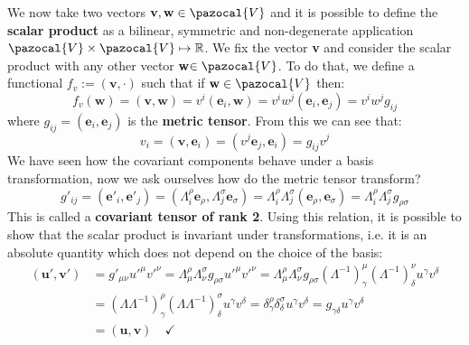\documentclass[../main.tex]{subfiles}
\begin{document}
We now take two vectors $\textbf{v},\textbf{w}\in\pazocal{V}$ and it is possible to define the \textbf{scalar product} as a bilinear, symmetric and non-degenerate application $\pazocal{V}\times\pazocal{V}\mapsto\mathbb{R}$. We fix the vector \textbf{v} and consider the scalar product with any other vector \textbf{w}$\in\pazocal{V}$. To do that, we define a functional $f_v:=(\textbf{v},\cdot)$ such that if $\textbf{w}\in\pazocal{V}$ then:
\[
f_v(\textbf{w})=(\textbf{v},\textbf{w})=v^i(\textbf{e}_i,\textbf{w})=v^iw^j(\textbf{e}_i,\textbf{e}_j)=v^iw^jg_{ij} 
\]
where $g_{ij}=(\textbf{e}_i,\textbf{e}_j)$ is the \textbf{metric tensor}. From this we can see that:
\[
v_i=(\textbf{v},\textbf{e}_i)=(v^j\textbf{e}_j,\textbf{e}_i)=g_{ij}v^j
\]
We have seen how the covariant components behave under a basis transformation, now we ask ourselves how do the metric tensor transform? 
\[
g'_{ij}=(\textbf{e}'_i,\textbf{e}'_j)=(\Lambda^\rho_i\textbf{e}_\rho,\Lambda^\sigma_j\textbf{e}_\sigma)=\Lambda^\rho_i\Lambda^\sigma_j(\textbf{e}_\rho,\textbf{e}_\sigma)=\Lambda^\rho_i\Lambda^\sigma_jg_{\rho\sigma}
\]
This is called a \textbf{covariant tensor of rank 2}. 
Using this relation, it is possible to show that the scalar product is invariant under transformations, i.e. it is an absolute quantity which does not depend on the choice of the basis:
\begin{align*}
(\textbf{u}',\textbf{v}')&=g'_{\mu\nu}u'^\mu v'^\nu=\Lambda^\rho_\mu\Lambda^\sigma_\nu g_{\rho\sigma}u'^\mu v'^\nu=\Lambda^\rho_\mu\Lambda^\sigma_\nu g_{\rho\sigma}(\Lambda^{-1})^\mu_\gamma(\Lambda^{-1})^\nu_\delta u^\gamma v^\delta\\
&=(\Lambda\Lambda^{-1})^\rho_\gamma(\Lambda\Lambda^{-1})^\sigma_\delta u^\gamma v^\delta=\delta^\rho_\gamma\delta^\sigma_\delta u^\gamma v^\delta=g_{\gamma\delta}u^\gamma v^\delta\\
&=(\textbf{u},\textbf{v}) \quad \checkmark
\end{align*}
\end{document}

